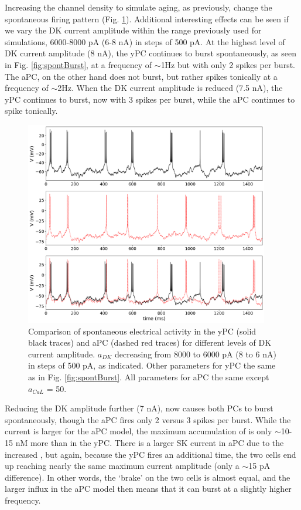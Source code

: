 \documentclass[12pt]{article}
\begin{document}
Increasing the {\Ca} channel density to simulate aging, as previously, change the spontaneous firing pattern (Fig. \ref{fig:burstingAging}). Additional interesting effects can be seen if we vary the DK current amplitude within the range previously used for simulations, 6000-8000 pA (6-8 nA) in steps of 500 pA. At the highest level of DK current amplitude (8 nA), the yPC continues to burst spontaneously, as seen in Fig. \ref{fig:spontBurst}, at a frequency of $\sim$1Hz but with only 2 spikes per burst. The aPC, on the other hand does not burst, but rather spikes tonically at a frequency of $\sim$2Hz. When the DK current amplitude is reduced (7.5 nA), the yPC continues to burst, now with 3 spikes per burst, while the aPC continues to spike tonically. 

\begin{figure}[h!]
\centering
\includegraphics[width=0.95\textwidth]{figures/fig6.png}
\caption{Comparison of spontaneous electrical activity in the yPC (solid black traces) and aPC (dashed red traces) for different levels of DK current amplitude. $a_{DK}$ decreasing from 8000 to 6000 pA (8 to 6 nA) in steps of 500 pA, as indicated. Other parameters for yPC the same as in Fig. \ref{fig:spontBurst}. All parameters for aPC the same except $a_{CaL}$ = 50.}
\label{fig:burstingAging}
\end{figure}

Reducing the DK amplitude further (7 nA), now causes both PCs to burst spontaneously, though the aPC fires only 2 versus 3 spikes per burst. While the {\Ca} current is larger for the aPC model, the maximum accumulation of {\Ca} is only $\sim$10-15 nM more than in the yPC. There is a larger SK current in aPC due to the increased {\Ca}, but again, because the yPC fires an additional time, the two cells end up reaching nearly the same maximum current amplitude (only a $\sim$15 pA difference). In other words, the `brake' on the two cells is almost equal, and the larger {\Ca} influx in the aPC model then means that it can burst at a slightly higher frequency. 
\end{document}
